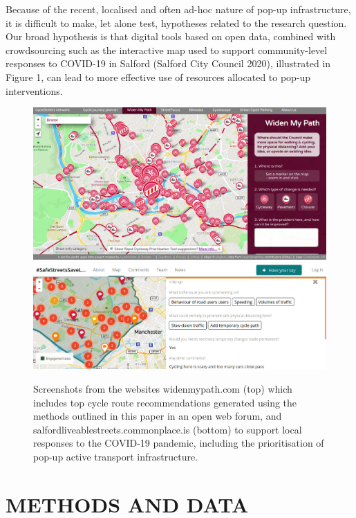 \documentclass[
]{article}
\begin{document}
Because of the recent, localised and often ad-hoc nature of pop-up infrastructure, it is difficult to make, let alone test, hypotheses related to the research question.
Our broad hypothesis is that digital tools based on open data, combined with crowdsourcing such as the interactive map used to support community-level responses to COVID-19 in Salford (Salford City Council 2020), illustrated in Figure 1, can lead to more effective use of resources allocated to pop-up interventions.

\begin{figure}
\includegraphics[width=1\linewidth]{figures/jpg/widenmypath} \includegraphics[width=1\linewidth]{figures/jpg/saferstreets} \caption{Screenshots from the websites widenmypath.com (top) which includes top cycle route recommendations generated using the methods outlined in this paper in an open web forum, and salfordliveablestreets.commonplace.is (bottom) to support local responses to the COVID-19 pandemic, including the prioritisation of pop-up active transport infrastructure.}\label{fig:commonplace}
\end{figure}

\hypertarget{methods-and-data}{%
\section{METHODS AND DATA}\label{methods-and-data}}
\end{document}
